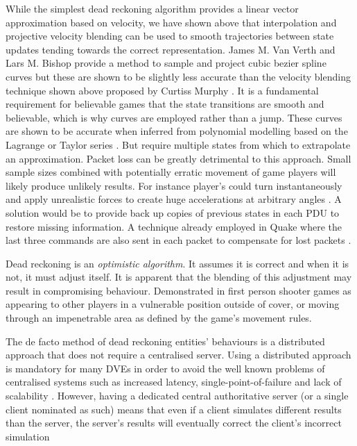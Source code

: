 \documentclass[journal]{IEEEtran}
\begin{document}
While the simplest dead reckoning algorithm provides a linear vector approximation based on velocity, we have shown above that interpolation and projective velocity blending can be used to smooth trajectories between state updates tending towards the correct representation. James M. Van Verth and Lars M. Bishop provide a method to sample and project cubic bezier spline curves \cite{van2008essential} but these are shown to be slightly less accurate than the velocity blending technique shown above proposed by Curtiss Murphy \cite{murphy2011believable}. It is a fundamental requirement for believable games that the state transitions are smooth and believable, which is why curves are employed rather than a jump. These curves are shown to be accurate when inferred from polynomial modelling based on the Lagrange or Taylor series \cite{hanawa2006proposal}. But require multiple states from which to extrapolate an approximation. Packet loss can be greatly detrimental to this approach. Small sample sizes combined with potentially erratic movement of game players will likely produce unlikely results. For instance player’s could turn instantaneously and apply unrealistic forces to create huge accelerations at arbitrary angles \cite{bernier2001latency}. A solution would be to provide back up copies of previous states in each PDU to restore missing information. A technique already employed in Quake where the last three commands are also sent in each packet to compensate for lost packets \cite{cronin2001distributed}.

Dead reckoning is an \textit{optimistic algorithm}. It assumes it is correct  and when it is not, it must adjust itself. It is apparent that the blending of this adjustment may result in compromising behaviour. Demonstrated in first person shooter games as appearing to other players in a vulnerable position outside of cover, or moving through an impenetrable area as defined by the game's movement rules.

The de facto method of dead reckoning entities' behaviours is a distributed approach that does not require a centralised server. Using a distributed approach is mandatory for many DVEs in order to avoid the well known problems of centralised systems such as increased latency, single-point-of-failure and lack of scalability \cite{mauve2000keep}. However, having a dedicated central authoritative server (or a single client nominated as such) means that even if a client simulates different results than the server, the server’s results will eventually correct the client’s incorrect simulation \cite{bernier2001latency}
\end{document}
